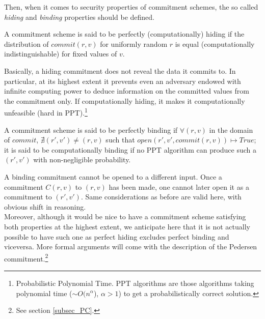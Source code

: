 \noindent
Then, when it comes to security properties of commitment schemes, the so called \textit{hiding} and \textit{binding} properties should be defined.
\begin{mydef}
\label{hiding}
    A commitment scheme is said to be perfectly (computationally) hiding if the distribution of $commit(r,v)$ for uniformly random $r$ is equal (computationally indistinguishable) for fixed values of $v$.
\end{mydef}
\noindent
Basically, a hiding commitment does not reveal the data it commits to. In particular, at its highest extent it prevents even an adversary endowed with infinite computing power to deduce information on the committed values from the commitment only. If computationally hiding, it makes it computationally unfeasible (hard in PPT).\footnote{Probabilistic Polynomial Time. PPT algorithms are those algorithms taking polynomial time ($\sim O(n^{\alpha}$), $\alpha > 1$) to get a probabilistically correct solution.}
\begin{mydef}
\label{binding}
    A commitment scheme is said to be perfectly binding if $\forall (r,v)$ in the domain of $commit$, $\nexists (r',v')\neq(r,v)$ such that $open(r',v',commit(r,v)) \mapsto True$; it is said to be computationally binding if no PPT algorithm can produce such a $(r',v')$ with non-negligible probability.
\end{mydef}
\noindent
A binding commitment cannot be opened to a different input. Once a commitment $C(r,v)$ to $(r,v)$ has been made, one cannot later open it as a commitment to $(r',v')$. Same considerations as before are valid here, with obvious shift in reasoning. \\
Moreover, although it would be nice to have a commitment scheme satisfying both properties at the highest extent, we anticipate here that it is not actually possible to have such one as perfect hiding excludes perfect binding and viceversa. More formal arguments will come with the description of the Pedersen commitment.\footnote{See section \ref{subsec_PC}.}


